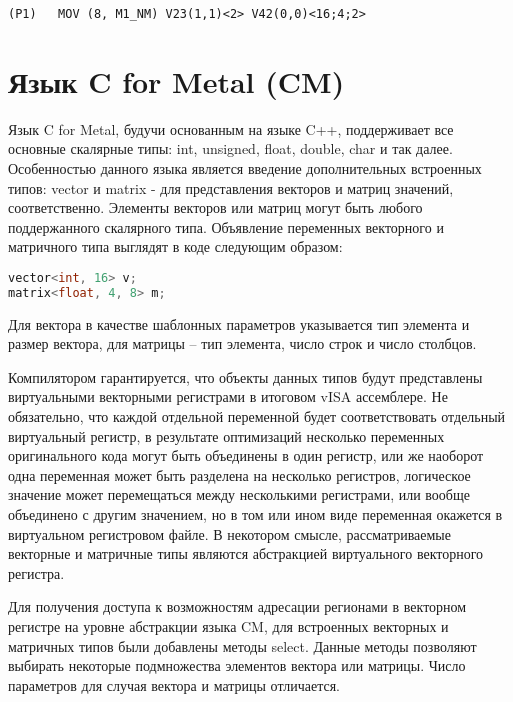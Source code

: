 \begin{lstlisting}[caption = {Пример инструкции MOV}, captionpos=b, label=lst:visa:mov]
    (P1)   MOV (8, M1_NM) V23(1,1)<2> V42(0,0)<16;4;2>
\end{lstlisting}

\section{Язык \foreignlanguage{english}{C for Metal (CM)}}

Язык \foreignlanguage{english}{C for Metal}, будучи основанным на языке C++, поддерживает все основные скалярные типы: int, unsigned, float, double, char и так далее.
Особенностью данного языка является введение дополнительных встроенных типов: vector и matrix - для представления векторов и матриц значений, соответственно.
Элементы векторов или матриц могут быть любого поддержанного скалярного типа.
Объявление переменных векторного и матричного типа выглядят в коде следующим образом:

\begin{lstlisting}[language=C++]
vector<int, 16> v;
matrix<float, 4, 8> m;
\end{lstlisting}

Для вектора в качестве шаблонных параметров указывается тип элемента и размер вектора, для матрицы -- тип элемента, число строк и число столбцов.

Компилятором гарантируется, что объекты данных типов будут представлены виртуальными векторными регистрами в итоговом vISA ассемблере.
Не обязательно, что каждой отдельной переменной будет соответствовать отдельный виртуальный регистр, в результате оптимизаций несколько переменных оригинального кода могут быть объединены в один регистр, или же наоборот одна переменная может быть разделена на несколько регистров, логическое значение может перемещаться между несколькими регистрами, или вообще объединено с другим значением, но в том или ином виде переменная окажется в виртуальном регистровом файле.
В некотором смысле, рассматриваемые векторные и матричные типы являются абстракцией виртуального векторного регистра.

Для получения доступа к возможностям адресации регионами в векторном регистре на уровне абстракции языка CM, для встроенных векторных и матричных типов были добавлены методы select.
Данные методы позволяют выбирать некоторые подмножества элементов вектора или матрицы.
Число параметров для случая вектора и матрицы отличается.

